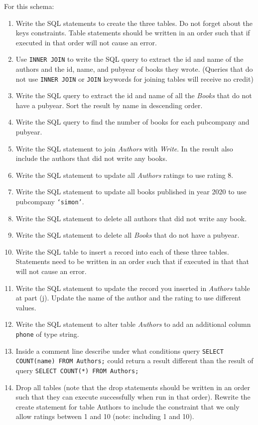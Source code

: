 \documentclass[letterpaper, 11pt]{article}
\begin{document}
For this schema:
\begin{enumerate}[label={\alph*})]
    \item Write the SQL statements to create the three tables. Do not forget about the keys constraints. Table statements should be written in an order such that if executed in that order will not cause an error. 
    \item Use \texttt{INNER JOIN} to write the SQL query to extract the id and name of the authors and the id, name, and pubyear of books they wrote. (Queries that do not use \texttt{INNER JOIN} or \texttt{JOIN} keywords for joining tables will receive no credit)
    \item Write the SQL query to extract the id and name of all the \textit{Books} that do not have a pubyear. Sort the result by name in descending order.
    \item Write the SQL query to find the number of books for each pubcompany and pubyear.
    \item Write the SQL statement to join \textit{Authors} with \textit{Write}. In the result also include the authors that did not write any books.
    \item Write the SQL statement to update all \textit{Authors} ratings to use rating 8.
    \item Write the SQL statement to update all books published in year 2020 to use {pubcompany} \texttt{`simon'}.
    \item Write the SQL statement to delete all authors that did not write any book.
    \item Write the SQL statement to delete all \textit{Books} that do not have a pubyear.
    \item Write the SQL table to insert a record into each of these three tables. Statements need to be written in an order such that if executed in that that will not cause an error.
    \item Write the SQL statement to update the record you inserted in \textit{Authors} table at part (j). Update the name of the author and the rating to use different values.
    \item Write the SQL statement to alter table \textit{Authors} to add an additional column \texttt{phone} of type string.
    \item Inside a comment line describe under what conditions query \texttt{SELECT COUNT(name) FROM Authors;} could return a result different than the result of query \texttt{SELECT COUNT(*) FROM Authors;}
    \item Drop all tables (note that the drop statements should be written in an order such that they can execute successfully when run in that order). Rewrite the create statement for table Authors to include the constraint that we only allow ratings between 1 and 10 (note: including 1 and 10). 
\end{enumerate}
\end{document}
